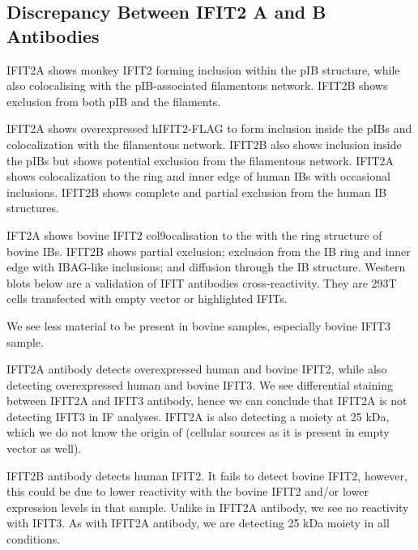 \subsection{Discrepancy Between IFIT2 A and B Antibodies} \label{subsec:Discrepancy Between IFIT2 A and B Antibodies}
IFIT2A shows monkey IFIT2 forming inclusion within the pIB structure, while also colocalising with the pIB-associated filamentous network.  IFIT2B shows exclusion from both pIB and the filaments.

IFIT2A shows overexpressed hIFIT2-FLAG to form inclusion inside the pIBs and colocalization with the filamentous network. IFIT2B also shows inclusion inside the pIBs but shows potential exclusion from the filamentous network.
IFIT2A shows colocalization to the ring and inner edge of human IBs with occasional inclusions. IFIT2B shows complete and partial exclusion from the human IB structures. 

IFT2A shows bovine IFIT2 col9ocalisation to the with the ring structure of bovine IBs. IFIT2B shows partial exclusion; exclusion from the IB ring and inner edge with IBAG-like inclusions; and diffusion through the IB structure.
Western blots below are a validation of IFIT antibodies cross-reactivity. They are 293T cells transfected with empty vector or highlighted IFITs.

We see less material to be present in bovine samples, especially bovine IFIT3 sample.

IFIT2A antibody detects overexpressed human and bovine IFIT2, while also detecting overexpressed human and bovine IFIT3. We see differential staining between IFIT2A and IFIT3 antibody, hence we can conclude that IFIT2A is not detecting IFIT3 in IF analyses. IFIT2A is also detecting a moiety at 25 kDa, which we do not know the origin of (cellular sources as it is present in empty vector as well).

IFIT2B antibody detects human IFIT2. It fails to detect bovine IFIT2, however, this could be due to lower reactivity with the bovine IFIT2 and/or lower expression levels in that sample. Unlike in IFIT2A antibody, we see no reactivity with IFIT3. As with IFIT2A antibody, we are detecting 25 kDa moiety in all conditions.

